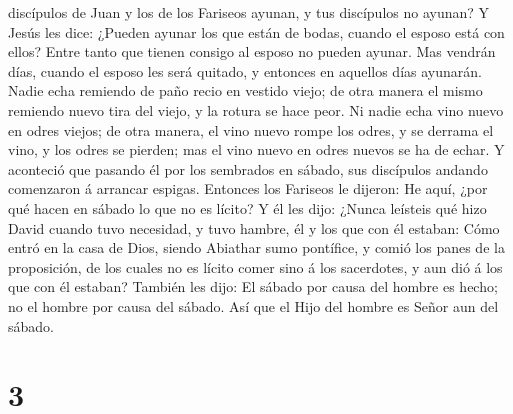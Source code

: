 discípulos de Juan y los de los Fariseos ayunan, y tus discípulos no
ayunan?  Y Jesús les dice: ¿Pueden ayunar los que están
de bodas, cuando el esposo está con ellos? Entre tanto que tienen
consigo al esposo no pueden ayunar.  Mas vendrán días,
cuando el esposo les será quitado, y entonces en aquellos días ayunarán.
 Nadie echa remiendo de paño recio en vestido viejo; de
otra manera el mismo remiendo nuevo tira del viejo, y la rotura se hace
peor.  Ni nadie echa vino nuevo en odres viejos; de otra
manera, el vino nuevo rompe los odres, y se derrama el vino, y los odres
se pierden; mas el vino nuevo en odres nuevos se ha de echar.
 Y aconteció que pasando él por los sembrados en sábado,
sus discípulos andando comenzaron á arrancar espigas. 
Entonces los Fariseos le dijeron: He aquí, ¿por qué hacen en sábado lo
que no es lícito?  Y él les dijo: ¿Nunca leísteis qué
hizo David cuando tuvo necesidad, y tuvo hambre, él y los que con él
estaban:  Cómo entró en la casa de Dios, siendo Abiathar
sumo pontífice, y comió los panes de la proposición, de los cuales no es
lícito comer sino á los sacerdotes, y aun dió á los que con él estaban?
 También les dijo: El sábado por causa del hombre es
hecho; no el hombre por causa del sábado.  Así que el
Hijo del hombre es Señor aun del sábado.

\hypertarget{section-2}{%
\section{3}\label{section-2}}

